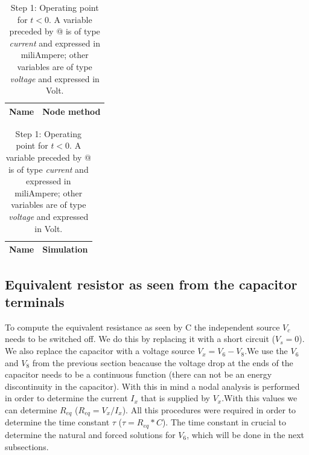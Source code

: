 \begin{table}[H]
\parbox{.45\linewidth}{
  \centering 
  \begin{tabular}{|l|r|}
    \hline    
    {\bf Name} & {\bf Node method}\\ \hline
    
  \end{tabular}
  \caption{A variable that starts with "Ir" and the variable "Gb" are of type {\em current}
    and expressed in milliampere (mA); all the other variables that start with a "V" are of the type {\it voltage} and expressed in
    Volt (V).}
  \label{tab:theoretical}
  
 }
 \hfill
 \parbox{.45\linewidth}{
 \centering
  \begin{tabular}{|l|r|}
    \hline    
    {\bf Name} & {\bf Simulation} \\ \hline
    
  \end{tabular}
  \caption{Step 1: Operating point for $t<0$. A variable preceded by @ is of type {\em current}
    and expressed in miliAmpere; other variables are of type {\it voltage} and expressed in
    Volt.}
  \label{tab:op}
 
 }
\end{table}


\subsection{Equivalent resistor as seen from the capacitor terminals}

To compute the equivalent resistance as seen by C the independent source $V_c$ needs to be switched off. We do this by replacing it with a short circuit ($V_s=0$). We also replace the capacitor with a voltage source $V_x=V_6-V_8$.We use the $V_6$ and $V_8$ from the previous section beacause the voltage drop at the ends of the capacitor needs to be a continuous function (there can not be an energy discontinuity in the capacitor). With this in mind a nodal analysis is performed in order to determine the current $I_x$ that is supplied by $V_x$.With this values we can determine $R_{eq}$ ($R_{eq}=V_x/I_x$). All this procedures were required in order to determine the time constant $\tau$ ($\tau=R_{eq}*C$). The time constant in crucial to determine the natural and forced solutions for $V_6$, which will be done in the next subsections. 

